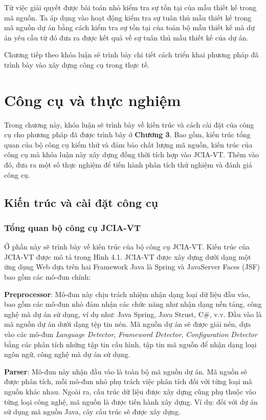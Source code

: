 \documentclass[12pt]{report}
\begin{document}
\noindent Từ việc giải quyết được bài toán nhỏ kiểm tra sự tồn tại của mẫu thiết kế trong mã nguồn. Ta áp dụng vào hoạt động kiểm tra sự tuân thủ mẫu thiết kế trong mã nguồn dự án bằng cách kiểm tra sự tồn tại của toàn bộ mẫu thiết kế mà dự án yêu cầu từ đó đưa ra được kết quả về sự tuân thủ mẫu thiết kế của dự án. 

\noindent Chương tiếp theo khóa luận sẽ trình bày chi tiết cách triển khai phương pháp đã trình bày vào xây dựng công cụ trong thực tế.
\chapter{Công cụ và thực nghiệm}
Trong chương này, khóa luận sẽ trình bày về kiến trúc và cách cài đặt của công cụ cho phương pháp đã được trình bày ở \textbf{Chương 3}. Bao gồm, kiến trúc tổng quan của bộ công cụ kiểm thử và đảm bảo chất lượng mã nguồn, kiến trúc của công cụ mà khóa luận này xây dựng đồng thời tích hợp vào JCIA-VT. Thêm vào đó, đưa ra một số thực nghiệm để tiến hành phân tích thử nghiệm và đánh giá công cụ.

\section{Kiến trúc và cài đặt công cụ}
\subsection{Tổng quan bộ công cụ JCIA-VT}
Ở phần này sẽ trình bày về kiến trúc của bộ công cụ JCIA-VT. Kiến trúc của JCIA-VT được mô tả trong Hình 4.1. JCIA-VT được xây dựng dưới dạng một ứng dụng Web dựa trên hai Framework Java là Spring và JavaServer Faces (JSF) bao gồm các mô-đun chính:

\noindent \textbf{Preprocessor}: Mô-đun này chịu trách nhiệm nhận dạng loại dữ liệu đầu vào, bao gồm các mô-đun nhỏ đảm nhận các chức năng như nhận dạng nền tảng, công nghệ mà dự án sử dụng, ví dụ như: Java Spring, Java Strust, C$\#$, v.v. Đầu vào là mã nguồn dự án dưới dạng tệp tin nén. Mã nguồn dự án sẽ được giải nén, dựa vào các mô-đun \textit{Language Detector}, \textit{Frameword Detector}, \textit{Configuration Detector} bằng các phân tích những tập tin cấu hình, tập tin mã nguồn để nhận dạng loại ngôn ngữ, công nghệ mà dự án sử dụng.

\noindent \textbf{Parser}: Mô-đun này nhận đầu vào là toàn bộ mã nguồn dự án. Mã nguồn sẽ được phân tích, mỗi mô-đun nhỏ phụ trách việc phân tích đối với từng loại mã nguồn khác nhau. Ngoài ra, cấu trúc dữ liệu được xây dựng cũng phụ thuộc vào từng loại công nghệ, mã nguồn là được tiến hành xây dựng. Ví dụ: đối với dự án sử dụng mã nguồn Java, cây cấu trúc sẽ được xây dựng.
\end{document}
